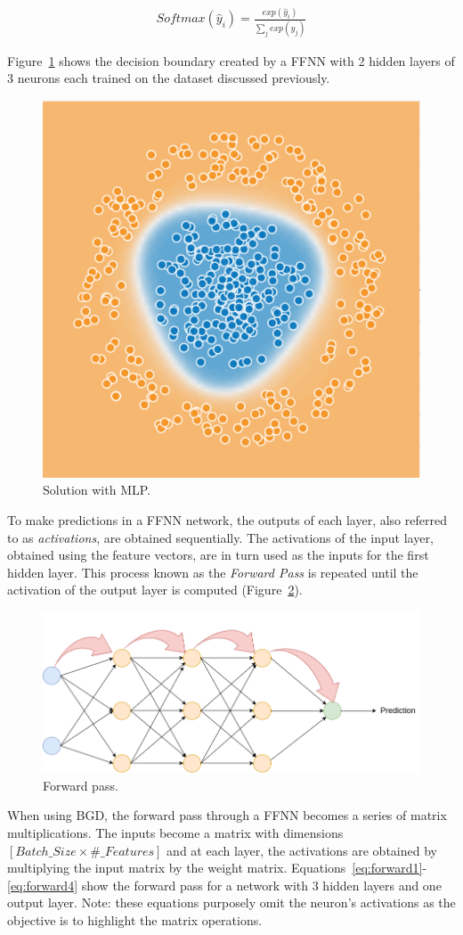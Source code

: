 \begin{align}
    Softmax(\hat{y}_i) = \frac{exp(\hat{y}_i)}{\sum_j exp(\hat{y}_j)}
    \label{eq:softmax}
\end{align}

Figure~\ref{fig:mlp_solved} shows the decision boundary created by a FFNN with 2 hidden layers of 3 neurons each trained on the dataset discussed previously.

\begin{figure}[!htbp]
    \centering
    \includegraphics[width=.35\textwidth]{Images/circles_solved.png}
    \caption{Solution with MLP.}
    \label{fig:mlp_solved}
\end{figure}

To make predictions in a FFNN network, the outputs of each layer, also referred to as \textit{activations}, are obtained sequentially. The activations of the input layer, obtained using the feature vectors, are in turn used as the inputs for the first hidden layer. This process known as the \textit{Forward Pass} is repeated until the activation of the output layer is computed (Figure~\ref{fig:forward}).

\begin{figure}[!htbp]
    \centering
    \includegraphics[width=.5\textwidth]{Images/forward_pass.png}
    \caption{Forward pass.}
    \label{fig:forward}
\end{figure}

When using BGD, the forward pass through a FFNN becomes a series of matrix multiplications. The inputs become a matrix with dimensions $[Batch\_Size \times \#\_Features]$ and at each layer, the activations are obtained by multiplying the input matrix by the weight matrix. Equations~\ref{eq:forward1}-\ref{eq:forward4} show the forward pass for a network with 3 hidden layers and one output layer. Note: these equations purposely omit the neuron's activations as the objective is to highlight the matrix operations.

